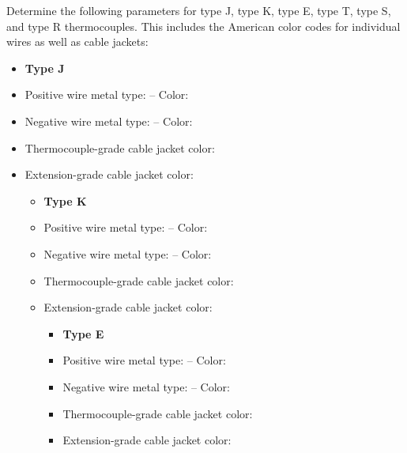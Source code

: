 

Determine the following parameters for type J, type K, type E, type T, type S, and type R thermocouples.  This includes the American color codes for individual wires as well as cable jackets:

\begin{itemize}
\item{} {\bf Type J}
\item{} Positive wire metal type: \underbar{\hskip 50pt} -- Color: \underbar{\hskip 50pt} 
\item{} Negative wire metal type: \underbar{\hskip 50pt} -- Color: \underbar{\hskip 50pt} 
\item{} Thermocouple-grade cable jacket color: \underbar{\hskip 50pt} 
\item{} Extension-grade cable jacket color: \underbar{\hskip 50pt} 
\medskip

\begin{itemize}
\item{} {\bf Type K}
\item{} Positive wire metal type: \underbar{\hskip 50pt} -- Color: \underbar{\hskip 50pt} 
\item{} Negative wire metal type: \underbar{\hskip 50pt} -- Color: \underbar{\hskip 50pt} 
\item{} Thermocouple-grade cable jacket color: \underbar{\hskip 50pt} 
\item{} Extension-grade cable jacket color: \underbar{\hskip 50pt} 
\medskip

\begin{itemize}
\item{} {\bf Type E}
\item{} Positive wire metal type: \underbar{\hskip 50pt} -- Color: \underbar{\hskip 50pt} 
\item{} Negative wire metal type: \underbar{\hskip 50pt} -- Color: \underbar{\hskip 50pt} 
\item{} Thermocouple-grade cable jacket color: \underbar{\hskip 50pt} 
\item{} Extension-grade cable jacket color: \underbar{\hskip 50pt} 
\medskip


\end{itemize}
\end{itemize}
\end{itemize}
